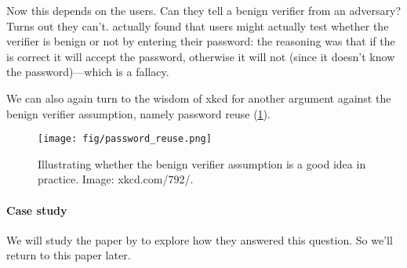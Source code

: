 Now this depends on the users.
Can they tell a benign verifier from an adversary?
Turns out they can't\autocite{WhyPhishingWorks}.
 actually found that users might actually test 
whether the verifier is benign or not by entering their password:
the reasoning was that if the is correct it will accept the password, otherwise 
it will not (since it doesn't know the password)---which is a fallacy.

We can also again turn to the wisdom of xkcd for another argument against the 
benign verifier assumption, namely password reuse (\cref{xkcd792}).

\begin{frame}
  \begin{figure}
    \texttt{[image: fig/password\_reuse.png]}
    \caption{%
      Illustrating whether the benign verifier assumption is a good idea in 
      practice.
      Image: xkcd.com/792/.
    }\label{xkcd792}
  \end{figure}
\end{frame}

\paragraph{Case study}

We will study the paper by \textcite{WhyPhishingWorks} to explore how they 
answered this question.
So we'll return to this paper later.

